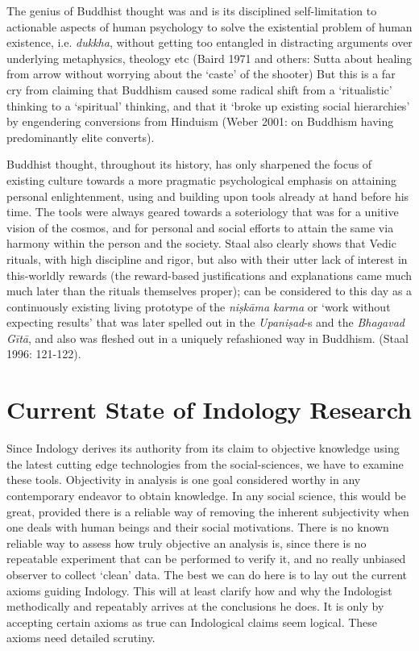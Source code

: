 The genius of Buddhist thought was and is its disciplined self-limitation to actionable aspects of human psychology to solve the existential problem of human existence, i.e. \textit{dukkha}, without getting too entangled in distracting arguments over underlying metaphysics, theology etc (Baird 1971 and others: Sutta about healing from arrow without worrying about the ‘caste’ of the shooter) But this is a far cry from claiming that Buddhism caused some radical shift from a `ritualistic’ thinking to a ‘spiritual’ thinking, and that it ‘broke up existing social hierarchies’ by engendering conversions from Hinduism (Weber 2001: on Buddhism having predominantly elite converts).

Buddhist thought, throughout its history, has only sharpened the focus of existing culture towards a more pragmatic psychological emphasis on attaining personal enlightenment, using and building upon tools already at hand before his time. The tools were always geared towards a soteriology that was for a unitive vision of the cosmos, and for personal and social efforts to attain the same via harmony within the person and the society. Staal also clearly shows that Vedic rituals, with high discipline and rigor, but also with their utter lack of interest in this-worldly rewards (the reward-based justifications and explanations came much much later than the rituals themselves proper); can be considered to this day as a continuously existing living prototype of the \textit{niṣkāma karma} or ‘work without expecting results’ that was later spelled out in the \textit{Upaniṣad}-s and the \textit{Bhagavad Gītā}, and also was fleshed out in a uniquely refashioned way in Buddhism. (Staal 1996: 121-122).


\section*{Current State of Indology Research}

Since Indology derives its authority from its claim to objective knowledge using the latest cutting edge technologies from the social-sciences, we have to examine these tools. Objectivity in analysis is one goal considered worthy in any contemporary endeavor to obtain knowledge. In any social science, this would be great, provided there is a reliable way of removing the inherent subjectivity when one deals with human beings and their social motivations. There is no known reliable way to assess how truly objective an analysis is, since there is no repeatable experiment that can be performed to verify it, and no really unbiased observer to collect ‘clean’ data. The best we can do here is to lay out the current axioms guiding Indology. This will at least clarify how and why the Indologist methodically and repeatably arrives at the conclusions he does. It is only by accepting certain axioms as true can Indological claims seem logical. These axioms need detailed scrutiny.


